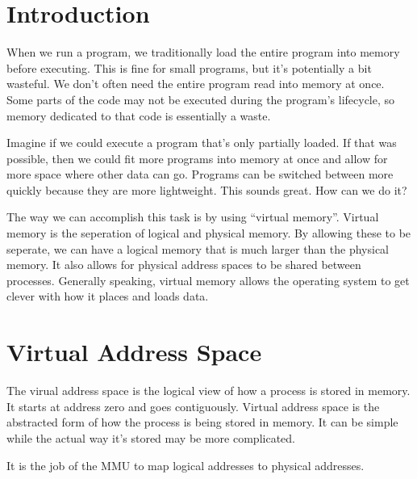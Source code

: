 \documentclass{article}
\begin{document}
\maketitle
\tableofcontents

\section{Introduction}
When we run a program, we traditionally load the entire program into memory
before executing. This is fine for small programs, but it's potentially a bit
wasteful. We don't often need the entire program read into memory at once.
Some parts of the code may not be executed during the program's lifecycle, so
memory dedicated to that code is essentially a waste.

Imagine if we could execute a program that's only partially loaded. If that was
possible, then we could fit more programs into memory at once and allow for
more space where other data can go. Programs can be switched between more
quickly because they are more lightweight. This sounds great. How can we do it?

The way we can accomplish this task is by using ``virtual memory''. Virtual
memory is the seperation of logical and physical memory. By allowing these to
be seperate, we can have a logical memory that is much larger than the physical
memory. It also allows for physical address spaces to be shared between
processes. Generally speaking, virtual memory allows the operating system to
get clever with how it places and loads data.

\section{Virtual Address Space}
The virual address space is the logical view of how a process is stored in
memory. It starts at address zero and goes contiguously. Virtual address space
is the abstracted form of how the process is being stored in memory. It can be
simple while the actual way it's stored may be more complicated.

It is the job of the MMU to map logical addresses to physical addresses.
\end{document}
